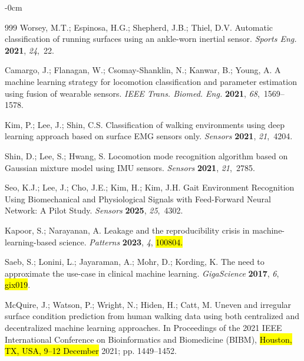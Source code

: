 \documentclass[sensors,article,accept,pdftex,moreauthors]{Definitions/mdpi}
\begin{document}
\begin{adjustwidth}{-\extralength}{0cm}
\begin{thebibliography}{999}
Worsey, M.T.; Espinosa, H.G.; Shepherd, J.B.; Thiel, D.V.
 Automatic classification of running surfaces using an ankle-worn
  inertial sensor.
 {\em Sports Eng.} {\bf 2021}, {\em 24},~22.

Camargo, J.; Flanagan, W.; Csomay-Shanklin, N.; Kanwar, B.; Young, A.
 A machine learning strategy for locomotion classification and
  parameter estimation using fusion of wearable sensors.
 {\em IEEE Trans. Biomed. Eng.} {\bf 2021}, {\em 68},~1569--1578.

Kim, P.; Lee, J.; Shin, C.S.
 Classification of walking environments using deep learning approach
  based on surface EMG sensors only.
 {\em Sensors} {\bf 2021}, {\em 21},~4204.

Shin, D.; Lee, S.; Hwang, S.
 Locomotion mode recognition algorithm based on Gaussian mixture model
  using IMU sensors.
 {\em Sensors} {\bf 2021}, {\em 21},~2785.

Seo, K.J.; Lee, J.; Cho, J.E.; Kim, H.; Kim, J.H.
 Gait Environment Recognition Using Biomechanical and Physiological
  Signals with Feed-Forward Neural Network: A Pilot Study.
 {\em Sensors} {\bf 2025}, {\em 25},~4302.

Kapoor, S.; Narayanan, A.
 Leakage and the reproducibility crisis in machine-learning-based
  science.
 {\em Patterns} {\bf 2023}, {\em 4}, \hl{100804.} %
 
Saeb, S.; Lonini, L.; Jayaraman, A.; Mohr, D.; Kording, K.
 The need to approximate the use-case in clinical machine learning.
 {\em GigaScience} {\bf 2017}, {\em 6}, \hl{gix019}.

McQuire, J.; Watson, P.; Wright, N.; Hiden, H.; Catt, M.
 Uneven and irregular surface condition prediction from human walking
  data using both centralized and decentralized machine learning approaches.
 In Proceedings of the 2021 IEEE International Conference on
  Bioinformatics and Biomedicine (BIBM),  \hl{Houston, TX, USA, 9--12 December} 2021; pp. 1449--1452.


\end{thebibliography}
\end{adjustwidth}
\end{document}
